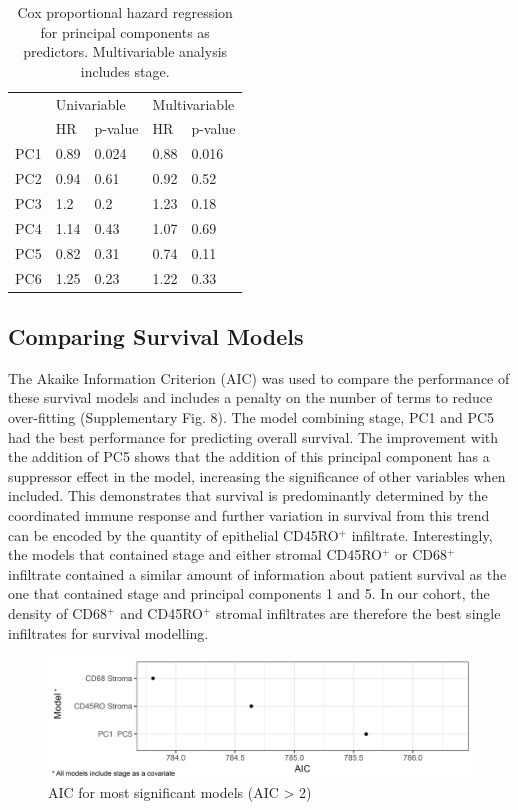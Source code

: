 \begin{table}[]
    \centering
    \begin{tabular}{lllll} \hline
         	&	\multicolumn{2}{l}{Univariable}			&	\multicolumn{2}{l}{Multivariable}			\\
 	&	HR	&	p-value	&	HR	&	p-value	\\ \hline
PC1	&	0.89	&	0.024	&	0.88	&	0.016	\\
PC2	&	0.94	&	0.61	&	0.92	&	0.52	\\
PC3	&	1.2	&	0.2	&	1.23	&	0.18	\\
PC4	&	1.14	&	0.43	&	1.07	&	0.69	\\
PC5	&	0.82	&	0.31	&	0.74	&	0.11	\\
PC6	&	1.25	&	0.23	&	1.22	&	0.33	\\ \hline

    \end{tabular}
    \caption[Cox proportional hazard regression for principal components]{Cox proportional hazard regression for principal components as predictors. Multivariable analysis includes stage.}
    \label{tab:pc_surv}
\end{table}

\subsection{Comparing Survival Models}
 The Akaike Information Criterion (AIC) was used to compare the performance of these survival models and includes a penalty on the number of terms to reduce over-fitting (Supplementary Fig. 8). The model combining stage, PC1 and PC5 had the best performance for predicting overall survival. The improvement with the addition of PC5 shows that the addition of this principal component has a suppressor effect in the model, increasing the significance of other variables when included. This demonstrates that survival is predominantly determined by the coordinated immune response and further variation in survival from this trend can be encoded by the quantity of epithelial CD45RO$^+$ infiltrate. Interestingly, the models that contained stage and either stromal CD45RO$^+$ or CD68$^+$ infiltrate contained a similar amount of information about patient survival as the one that contained stage and principal components 1 and 5. In our cohort, the density of CD68$^+$ and CD45RO$^+$ stromal infiltrates are therefore the best single infiltrates for survival modelling. 
 
 \begin{figure}
     \centering
     \includegraphics[width=\textwidth]{AIC}
     \caption{AIC for most significant models (AIC > 2)}
     \label{fig:AIC}
 \end{figure}


